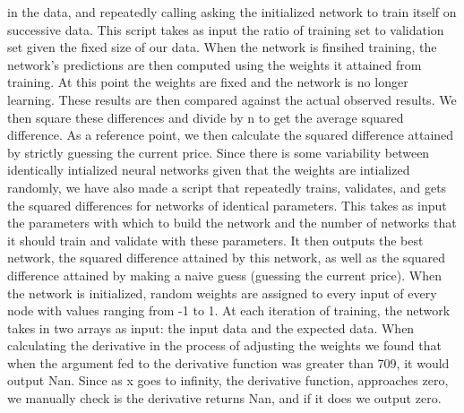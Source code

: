 \documentclass[a4paper,10pt]{article}
\begin{document}
in the data, and repeatedly calling asking the initialized network to train itself on successive data.  This script takes
as input the ratio of training set to validation set given the fixed size of our data.  When the network is finsihed training,
the network's predictions are then computed using the weights it attained from training.  At this point the weights are fixed
and the network is no longer learning.  These results are then compared against the actual observed results.  We then square these
differences and divide by n to get the average squared difference.  As a reference point, we then calculate the squared difference
attained by strictly guessing the current price.  
\newline \newline
Since there is some variability between identically intialized neural networks given that the weights are intialized randomly, 
we have also made a script that repeatedly trains, validates, and gets the squared differences for networks of identical 
parameters.  This takes as input the parameters with which to build the network and the number of networks that it should
train and validate with these parameters.  It then outputs the best network, the squared difference attained by this network,
as well as the squared difference attained by making a naive guess (guessing the current price).
\newline \newline
When the network is initialized, random weights are assigned to every input of every node with values ranging from -1 to 1.
At each iteration of training, the network takes in two arrays as input: the input data and the expected data.  When calculating
the derivative in the process of adjusting the weights we found that when the argument fed to the derivative function was
greater than 709, it would output Nan.  Since as x goes to infinity, the derivative function, approaches zero, we manually
check is the derivative returns Nan, and if it does we output zero.
\end{document}

